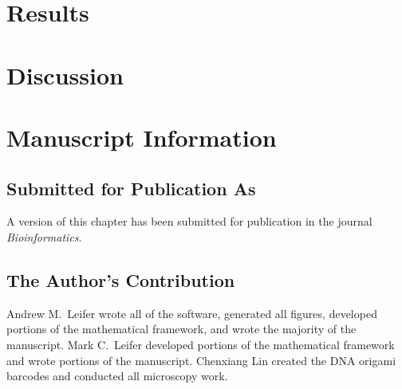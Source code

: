 \section{Results}

\section{Discussion}


\section{Manuscript Information}
\subsection{Submitted for Publication As}
A version of this chapter has been submitted for publication in the journal \textit{Bioinformatics}.

\subsection{The Author's Contribution}
Andrew M.~Leifer wrote all of the software, generated all figures, developed portions of the mathematical framework, and wrote the majority of the manuscript. Mark C.~Leifer developed portions of the mathematical framework and wrote portions of the manuscript. Chenxiang Lin created the DNA origami barcodes and conducted all microscopy work. 
 